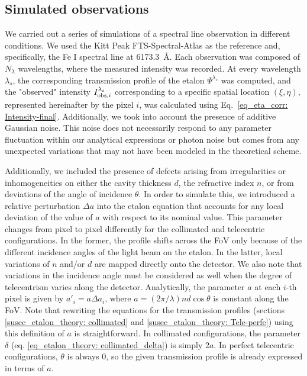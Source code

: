 \subsection{\label{eta_corr_susec: simulating obs} Simulated observations}
  
  
We carried out a series of simulations of a spectral line observation in different conditions. We used the Kitt Peak FTS-Spectral-Atlas as the reference \citep{fts} and, specifically, the Fe I spectral line at 6173.3~\r{A}. Each observation was composed of $N_\lambda$ wavelengths, where the measured intensity was recorded. At every wavelength $\lambda_s$, the corresponding transmission profile of the etalon $\Psi^{\lambda_s}$ was computed, and the "observed" intensity $I ^{\lambda _ s} _ {{\rm obs}, i}$ corresponding to a specific spatial location $(\xi, \eta)$, represented hereinafter by the pixel $i$, was calculated using Eq.~\eqref{eq_eta_corr: Intensity-final}. Additionally, we took into account the presence of additive Gaussian noise. This noise does not necessarily respond to any parameter fluctuation within our analytical expressions or photon noise but comes from any unexpected variations that may not have been modeled in the theoretical scheme.

Additionally, we included the presence of defects arising from irregularities or inhomogeneities on either the cavity thickness $d$, the refractive index $n$, or from deviations of the angle of incidence $\theta$. In order to simulate this, we introduced a relative perturbation $\Delta a$ into the etalon equation that accounts for any local deviation of the value of $a$ with respect to its nominal value. This parameter changes from pixel to pixel differently for the collimated and telecentric configurations. In the former, the profile shifts across the FoV only because of the different incidence angles of the light beam on the etalon. In the latter, local variations of $n$ and/or $d$ are mapped directly onto the detector. We also note that variations in the incidence angle must be considered as well when the degree of telecentrism varies along the detector. Analytically, the parameter $a$ at each $i$-th pixel is given by $a' _ i = a \Delta a _ i$, where $a = (2\pi/\lambda) n d\cos\theta$ is constant along the FoV. Note that rewriting the equations for the transmission profiles (sections \ref{susec_etalon_theory: collimated} and \ref{susec_etalon_theory: Tele-perfe}) using this definition of $a$ is straightforward. In collimated configurations, the parameter $\delta$ (eq. \eqref{eq_etalon_theory: collimated_delta}) is simply $2a$. In perfect telecentric configurations, $\theta$ is always 0, so the given transmission profile is already expressed in terms of $a$.   

